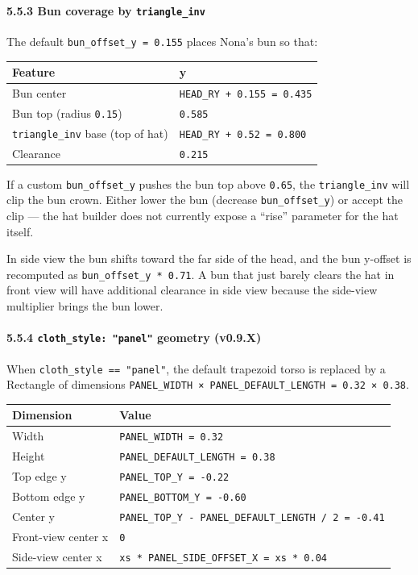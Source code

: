 \documentclass[
  11pt,
]{book}
\begin{document}
\paragraph{\texorpdfstring{5.5.3 Bun coverage by
\texttt{triangle\_inv}}{5.5.3 Bun coverage by triangle\_inv}}\label{bun-coverage-by-triangle_inv}

The default \texttt{bun\_offset\_y\ =\ 0.155} places Nona's bun so that:

\begin{longtable}[]{@{}ll@{}}
\toprule\noalign{}
Feature & y \\
\midrule\noalign{}
\endhead
\bottomrule\noalign{}
\endlastfoot
Bun center & \texttt{HEAD\_RY\ +\ 0.155\ =\ 0.435} \\
Bun top (radius \texttt{0.15}) & \texttt{0.585} \\
\texttt{triangle\_inv} base (top of hat) &
\texttt{HEAD\_RY\ +\ 0.52\ =\ 0.800} \\
Clearance & \texttt{0.215} \\
\end{longtable}

If a custom \texttt{bun\_offset\_y} pushes the bun top above
\texttt{0.65}, the \texttt{triangle\_inv} will clip the bun crown.
Either lower the bun (decrease \texttt{bun\_offset\_y}) or accept the
clip --- the hat builder does not currently expose a ``rise'' parameter
for the hat itself.

In side view the bun shifts toward the far side of the head, and the bun
y-offset is recomputed as \texttt{bun\_offset\_y\ *\ 0.71}. A bun that
just barely clears the hat in front view will have additional clearance
in side view because the side-view multiplier brings the bun lower.

\paragraph{\texorpdfstring{5.5.4 \texttt{cloth\_style:\ "panel"}
geometry
(v0.9.X)}{5.5.4 cloth\_style: "panel" geometry (v0.9.X)}}\label{cloth_style-panel-geometry-v0.9.x}

When \texttt{cloth\_style\ ==\ "panel"}, the default trapezoid torso is
replaced by a Rectangle of dimensions
\texttt{PANEL\_WIDTH\ ×\ PANEL\_DEFAULT\_LENGTH\ =\ 0.32\ ×\ 0.38}.

\begin{longtable}[]{@{}ll@{}}
\toprule\noalign{}
Dimension & Value \\
\midrule\noalign{}
\endhead
\bottomrule\noalign{}
\endlastfoot
Width & \texttt{PANEL\_WIDTH\ =\ 0.32} \\
Height & \texttt{PANEL\_DEFAULT\_LENGTH\ =\ 0.38} \\
Top edge y & \texttt{PANEL\_TOP\_Y\ =\ -0.22} \\
Bottom edge y & \texttt{PANEL\_BOTTOM\_Y\ =\ -0.60} \\
Center y &
\texttt{PANEL\_TOP\_Y\ -\ PANEL\_DEFAULT\_LENGTH\ /\ 2\ =\ -0.41} \\
Front-view center x & \texttt{0} \\
Side-view center x &
\texttt{xs\ *\ PANEL\_SIDE\_OFFSET\_X\ =\ xs\ *\ 0.04} \\
\end{longtable}
\end{document}
